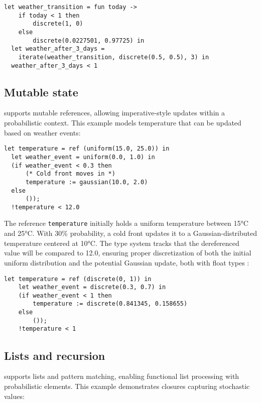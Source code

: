 \begin{lstlisting}[aboveskip=1em,belowskip=1em,escapechar=!]
  let weather_transition = fun today -> 
    if today < 1 then
        discrete(1, 0)
    else
        discrete(0.0227501, 0.97725) in
  let weather_after_3_days = 
    iterate(weather_transition, discrete(0.5, 0.5), 3) in
  weather_after_3_days < 1
\end{lstlisting}


\subsection{Mutable state}

\Slice{} supports mutable references, allowing imperative-style updates within a probabilistic context. This example models temperature that can be updated based on weather events:

\begin{lstlisting}[aboveskip=1em,belowskip=1em,escapechar=!]
  let temperature = ref (uniform(15.0, 25.0)) in
  let weather_event = uniform(0.0, 1.0) in
  (if weather_event < 0.3 then
      (* Cold front moves in *)
      temperature := gaussian(10.0, 2.0)
  else
      ());
  !temperature < 12.0
\end{lstlisting}

\noindent The reference \texttt{temperature} initially holds a uniform temperature between 15°C and 25°C. With 30\% probability, a cold front updates it to a Gaussian-distributed temperature centered at 10°C. The type system tracks that the dereferenced value will be compared to 12.0, ensuring proper discretization of both the initial uniform distribution and the potential Gaussian update, both with float types :

\begin{lstlisting}[aboveskip=1em,belowskip=1em,escapechar=!]
    let temperature = ref (discrete(0, 1)) in
    let weather_event = discrete(0.3, 0.7) in
    (if weather_event < 1 then
        temperature := discrete(0.841345, 0.158655)
    else
        ()); 
    !temperature < 1
\end{lstlisting}

\subsection{Lists and recursion}

\Slice{} supports lists and pattern matching, enabling functional list processing with probabilistic elements. This example demonstrates closures capturing stochastic values:

